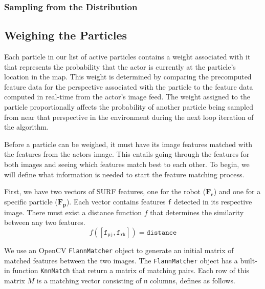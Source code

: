 \documentclass[a4paper,11pt]{article}
\begin{document}
\subsubsection{Sampling from the Distribution}

\subsection{Weighing the Particles}
Each particle in our list of active particles contains a weight associated with it that represents the probability that the actor is currently at the particle's location in the map. This weight is determined by comparing the precomputed feature data for the perspective associated with the particle to the feature data computed in real-time from the actor's image feed. The weight assigned to the particle proportionally affects the probability of another particle being sampled from near that perspective in the environment during the next loop iteration of the algorithm.

Before a particle can be weighed, it must have its image features matched with the features from the actors image. This entails going through the features for both images and seeing which features match best to each other. To begin, we will define what information is needed to start the feature matching process. 

First, we have two vectors of SURF features, one for the robot ($\boldsymbol{F_r }$) and one for a specific particle ($\boldsymbol{F_p}$). Each vector contains features \verb.f. detected in its respective image. There must exist a distance function $f$ that determines the similarity between any two features. 
 \[ f(\mathtt{[f_{pj}, f_{rk}]}) = \mathtt{distance}\]

   We use an OpenCV \texttt{FlannMatcher} object to generate an initial matrix of matched features between the two images. The \texttt{FlannMatcher} object has a built-in function \texttt{KnnMatch} that return a matrix of matching pairs. Each row of this matrix $M$ is a matching vector consisting of \texttt{n} columns, defines as follows.
\end{document}

